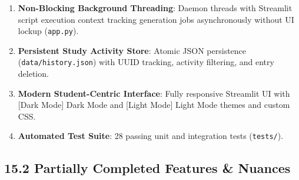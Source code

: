 \documentclass[
]{article}
\providecommand{\tightlist}{%
  \setlength{\itemsep}{0pt}\setlength{\parskip}{0pt}}
\begin{document}
\begin{enumerate}
  \begin{itemize}
  \tightlist
  \item
    Grounded Q\&A with verifiable page-level references.
  \item
    Multiple Choice Practice Quizzes with automated form-based grading.
  \item
    Digital Flashcard decks with front prompt / back definition
    expansion.
  \item
    Chapter Revision Summaries with key takeaway bullet points.
  \end{itemize}
\item
  \textbf{Non-Blocking Background Threading}: Daemon threads with
  Streamlit script execution context tracking generation jobs
  asynchronously without UI lockup (\texttt{app.\allowbreak py}).
\item
  \textbf{Persistent Study Activity Store}: Atomic JSON persistence
  (\texttt{data/\allowbreak history.\allowbreak json}) with UUID tracking, activity filtering,
  and entry deletion.
\item
  \textbf{Modern Student-Centric Interface}: Fully responsive Streamlit
  UI with {[}Dark Mode{]} Dark Mode and {[}Light Mode{]} Light Mode
  themes and custom CSS.
\item
  \textbf{Automated Test Suite}: 28 passing unit and integration tests
  (\texttt{tests/\allowbreak }).
\end{enumerate}

\subsection{15.2 Partially Completed Features \&
Nuances}\label{partially-completed-features-nuances}
\end{document}
